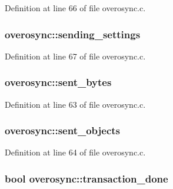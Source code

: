 Definition at line 66 of file overosync.\-c.

\hypertarget{structoverosync_a7a7d310f38281bd01857a3a6e818f16e}{
\subsubsection[{sending\-\_\-settings}]{ overosync\-::sending\-\_\-settings}}\label{structoverosync_a7a7d310f38281bd01857a3a6e818f16e}


Definition at line 67 of file overosync.\-c.

\hypertarget{structoverosync_ae75efe9626e6cd54b7f51937d7ccc8bd}{
\subsubsection[{sent\-\_\-bytes}]{ overosync\-::sent\-\_\-bytes}}\label{structoverosync_ae75efe9626e6cd54b7f51937d7ccc8bd}


Definition at line 63 of file overosync.\-c.

\hypertarget{structoverosync_ace6edc8026e30f605d99e5f01c6d66a9}{
\subsubsection[{sent\-\_\-objects}]{ overosync\-::sent\-\_\-objects}}\label{structoverosync_ace6edc8026e30f605d99e5f01c6d66a9}


Definition at line 64 of file overosync.\-c.

\hypertarget{structoverosync_a065e182f37469dcd89b3de4464d91267}{
\subsubsection[{transaction\-\_\-done}]{ {\bf bool} overosync\-::transaction\-\_\-done}}\label{structoverosync_a065e182f37469dcd89b3de4464d91267}


